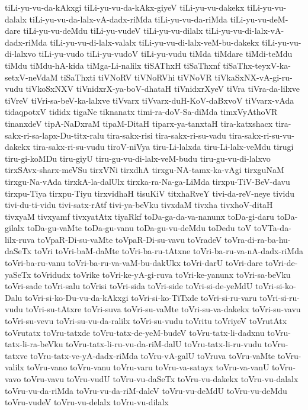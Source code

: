 {tiLi-yu-vu-da-kAkxgi
tiLi-yu-vu-da-kAkx-giyeV
tiLi-yu-vu-dakekx
tiLi-yu-vu-dalalx
tiLi-yu-vu-da-lalx-vA-dadx-riMda
tiLi-yu-vu-da-riMda
tiLi-yu-vu-deM-dare
tiLi-yu-vu-deMdu
tiLi-yu-vudeV
tiLi-yu-vu-dilalx
tiLi-yu-vu-di-lalx-vA-dadx-riMda
tiLi-yu-vu-di-lalx-valalx
tiLi-yu-vu-di-lalx-veM-bu-dakekx
tiLi-yu-vu-di-lalxvo
tiLi-yu-vudo
tiLi-yu-vudoV
tiLi-yu-vudu
tiMda
tiMdare
tiMdi-teMdu
tiMdu
tiMdu-hA-kida
tiMga-Li-nalilx
tiSAThxH
tiSaThxnf
tiSaThx-teyxV-ka-setxV-neVdaM
tiSaThxti
tiVNoRV
tiVNoRVhi
tiVNoVR
tiVkaSxNX-vA-gi-ru-vudu
tiVkoSxNXV
tiVnidxrX-ya-boV-dhataH
tiVnidxrXyeV
tiVra
tiVra-da-lilxve
tiVreV
tiVri-sa-beV-ka-lalxve
tiVvarx
tiVvarx-duH-KoV-daBxvoV
tiVvarx-vAda
tidaqpotxV
tididx
tigaNe
tiknanatx
timi-ra-doV-Sa-diMda
timxVyAthoVR
tinanxdeV
tipA-NaDxraM
tipaM-DitaH
tiparx-ya-tanxtaH
tira-katxshacx
tira-sakx-ri-sa-lapx-Du-titx-ralu
tira-sakx-risi
tira-sakx-ri-su-vadu
tira-sakx-ri-su-vu-dakekx
tira-sakx-ri-su-vudu
tiroV-niVya
tiru-Li-lalxda
tiru-Li-lalx-veMdu
tirugi
tiru-gi-koMDu
tiru-giyU
tiru-gu-vu-di-lalx-veM-budu
tiru-gu-vu-di-lalxvo
tirxSAvx-sharx-meVSu
tirxVNi
tirxdhA
tirxgu-NA-tamx-ka-vAgi
tirxguNaM
tirxgu-Na-vAda
tirxkA-la-dalUlx
tirxka-ra-Na-ga-LiMda
tirxpu-TiV-BeV-davu
tirxpu-Tiya
tirxpu-Tiyu
tirxvidhaH
tisuKiV
titxhaRveY
tivi-da-reV-neye
tividu
tivi-du-ti-vidu
tivi-satx-rAtf
tivi-ya-beVku
tivxdaM
tivxha
tivxhoV-ditaH
tivxyaM
tivxyamf
tivxyatAtx
tiyaRkf
toDa-ga-da-va-nanunx
toDa-gi-daru
toDa-gilalx
toDa-gu-vaMte
toDa-gu-vanu
toDa-gu-vu-deMdu
toDedu
toV
toVTa-da-lilx-ruva
toVpaR-Di-su-vaMte
toVpaR-Di-su-vavu
toVradeV
toVra-di-ra-ba-hu-daSeTx
toVri
toVri-baM-daMte
toVri-ba-ru-tAtxne
toVri-ba-ru-va-nA-dadx-riMda
toVri-ba-ru-vanu
toVri-ba-ru-va-vaM-bu-dakUkx
toVri-darU
toVri-dare
toVri-de-yaSeTx
toVridudx
toVrike
toVri-ke-yA-gi-ruva
toVri-ke-yanunx
toVri-sa-beVku
toVri-sade
toVri-salu
toVrisi
toVri-sida
toVri-side
toVri-si-de-yeMdU
toVri-si-ko-Dalu
toVri-si-ko-Du-vu-da-kAkxgi
toVri-si-ko-TiTxde
toVri-si-ru-varu
toVri-si-ru-vudu
toVri-su-tAtxre
toVri-suva
toVri-su-vaMte
toVri-su-va-dakekx
toVri-su-vavu
toVri-su-vevu
toVri-su-vu-da-ralilx
toVri-su-vudu
toVritu
toVriyeV
toVrutAtx
toVrutatx
toVru-tatxde
toVru-tatx-de-yeM-budeV
toVru-tatx-li-dadxnu
toVru-tatx-li-ra-beVku
toVru-tatx-li-ru-vu-da-riM-dalU
toVru-tatx-li-ru-vudu
toVru-tatxve
toVru-tatx-ve-yA-dadx-riMda
toVru-vA-galU
toVruva
toVru-vaMte
toVru-valilx
toVru-vano
toVru-vanu
toVru-varu
toVru-va-satayx
toVru-va-vanU
toVru-vavo
toVru-vavu
toVru-vudU
toVru-vu-daSeTx
toVru-vu-dakekx
toVru-vu-dalalx
toVru-vu-da-riMda
toVru-vu-da-riM-daleV
toVru-vu-deMdU
toVru-vu-deMdu
toVru-vudeV
toVru-vu-delalx
toVru-vu-dilalx
}
